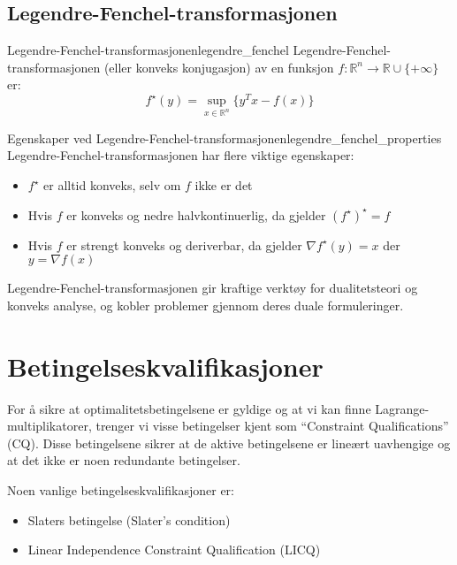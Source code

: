\subsection{Legendre-Fenchel-transformasjonen}

\begin{definition}{Legendre-Fenchel-transformasjonen}{legendre_fenchel}
	Legendre-Fenchel-transformasjonen (eller konveks konjugasjon) av en funksjon \( f: \mathbb{R}^n \to \mathbb{R} \cup \{+\infty\} \) er:
	\[
		f^\star(y) = \sup_{x \in \mathbb{R}^n} \{y^Tx - f(x)\}
	\]
\end{definition}

\begin{theorem}{Egenskaper ved Legendre-Fenchel-transformasjonen}{legendre_fenchel_properties}
	Legendre-Fenchel-transformasjonen har flere viktige egenskaper:
	\begin{itemize}
		\item \( f^\star \) er alltid konveks, selv om \( f \) ikke er det
		\item Hvis \( f \) er konveks og nedre halvkontinuerlig, da gjelder \( (f^\star)^\star = f \)
		\item Hvis \( f \) er strengt konveks og deriverbar, da gjelder \( \nabla f^\star(y) = x \) der \( y = \nabla f(x) \)
	\end{itemize}
\end{theorem}

Legendre-Fenchel-transformasjonen gir kraftige verktøy for dualitetsteori og konveks analyse, og kobler problemer gjennom deres duale formuleringer.

\section{Betingelseskvalifikasjoner}

For å sikre at optimalitetsbetingelsene er gyldige og at vi kan finne Lagrange-multiplikatorer, trenger vi visse betingelser kjent som \enquote{Constraint Qualifications} (CQ).
Disse betingelsene sikrer at de aktive betingelsene er lineært uavhengige og at det ikke er noen redundante betingelser.

Noen vanlige betingelseskvalifikasjoner er:
\begin{itemize}
	\item Slaters betingelse (Slater's condition)
	\item Linear Independence Constraint Qualification (LICQ)
\end{itemize}

